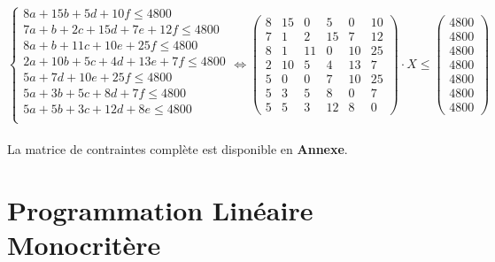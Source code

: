 \documentclass[a4paper, 11pt]{article}
\begin{document}
$$
\left\{\begin{split}
	8a+15b+5d+10f \leq 4800 \\
    7a+b+2c+15d+7e+12f \leq 4800 \\
    8a+b+11c+10e+25f \leq 4800 \\
    2a+10b+5c+4d+13e+7f \leq 4800 \\
    5a+7d+10e+25f \leq 4800 \\
	5a+3b+5c+8d+7f \leq 4800\\
	5a+5b+3c+12d+8e \leq 4800\\
\end{split}\right. \Leftrightarrow \begin{pmatrix}
        8&15&0&5&0&10 \\
        7&1&2&15&7&12\\
        8&1&11&0&10&25\\
        2&10&5&4&13&7\\
        5&0&0&7&10&25\\
        5&3&5&8&0&7\\
        5&5&3&12&8&0
    \end{pmatrix} \cdot X \leq \begin{pmatrix}
        4800\\
        4800\\
        4800\\
        4800\\
        4800\\
        4800\\
        4800
    \end{pmatrix}
$$ \\
La matrice de contraintes complète est disponible en \textbf{Annexe}.\\
\section{Programmation Linéaire Monocritère}
\end{document}
